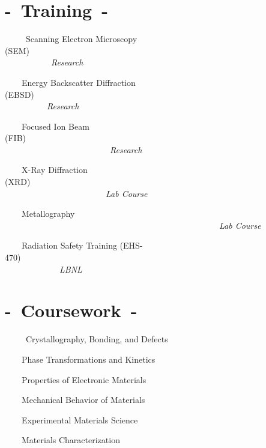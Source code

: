 \documentclass[11pt,letterpaper,sans]{moderncv}        %
\begin{document}
\section{-\ Training\ -}
\ \ \ \ \ {Scanning Electron Microscopy (SEM)\ \ \ \ \ \ \ \ \ \ \ \ \ \ \ \ \ \ \ \ \ \ \ \ \ \ \ \ \ \ \ \ \ \ \ \ \ \ \ \ \ \ \ \ \ \ \ \ \ \ \ \ \ \ \ \ \ \ \ \ \ \ \ \ \ \ \ \ \ \ \ \ \ \ \ \ \ \textit{Research}}

\ \ \ \ {Energy Backscatter Diffraction (EBSD)\ \ \ \ \ \ \ \ \ \ \ \ \ \ \ \ \ \ \ \ \ \ \ \ \ \ \ \ \ \ \ \ \ \ \ \ \ \ \ \ \ \ \ \ \ \ \ \ \ \ \ \ \ \ \ \ \ \ \ \ \ \ \ \ \ \ \ \ \ \ \ \ \ \ \ \textit{Research}}

\ \ \ \ {Focused Ion Beam (FIB)\ \ \ \ \ \ \ \ \ \ \ \ \ \ \ \ \ \ \ \ \ \ \ \ \ \ \ \ \ \ \ \ \ \ \ \ \ \ \ \ \ \ \ \ \ \ \ \ \ \ \ \ \ \ \ \ \ \ \ \ \ \ \ \ \ \ \ \ \ \ \ \ \ \ \ \ \ \ \ \ \ \ \ \ \ \ \ \ \ \ \ \ \textit{Research}}

\ \ \ \ {X-Ray Diffraction (XRD)\ \ \ \ \ \ \ \ \ \ \ \ \ \ \ \ \ \ \ \ \ \ \ \ \ \ \ \ \ \ \ \ \ \ \ \ \ \ \ \ \ \ \ \ \ \ \ \ \ \ \ \ \ \ \ \ \ \ \ \ \ \ \ \ \ \ \ \ \ \ \ \ \ \ \ \ \ \ \ \ \ \ \ \ \ \ \ \ \ \textit{Lab Course}}

\ \ \ \ {Metallography\ \ \ \ \ \ \ \ \ \ \ \ \ \ \ \ \ \ \ \ \ \ \ \ \ \ \ \ \ \ \ \ \ \ \ \ \ \ \ \ \ \ \ \ \ \ \ \ \ \ \ \ \ \ \ \ \ \ \ \ \ \ \ \ \ \ \ \ \ \ \ \ \ \ \ \ \ \ \ \ \ \ \ \ \ \ \ \ \ \ \ \ \ \ \ \ \ \ \ \ \ \ \ \ \ \ \textit{Lab Course}}

\ \ \ \ {Radiation Safety Training (EHS-470)\ \ \ \ \ \ \ \ \ \ \ \ \ \ \ \ \ \ \ \ \ \ \ \ \ \ \ \ \ \ \ \ \ \ \ \ \ \ \ \ \ \ \ \ \ \ \ \ \ \ \ \ \ \ \ \ \ \ \ \ \ \ \ \ \ \ \ \ \ \ \ \ \ \ \ \ \ \ \ \ \ \textit{LBNL}}



\section{-\ Coursework\ -}

\ \ \ \ \ {Crystallography, Bonding, and Defects}

\ \ \ \ {Phase Transformations and Kinetics}

\ \ \ \ {Properties of Electronic Materials}

\ \ \ \ {Mechanical Behavior of Materials}

\ \ \ \ {Experimental Materials Science}

\ \ \ \ {Materials Characterization}
\end{document}
